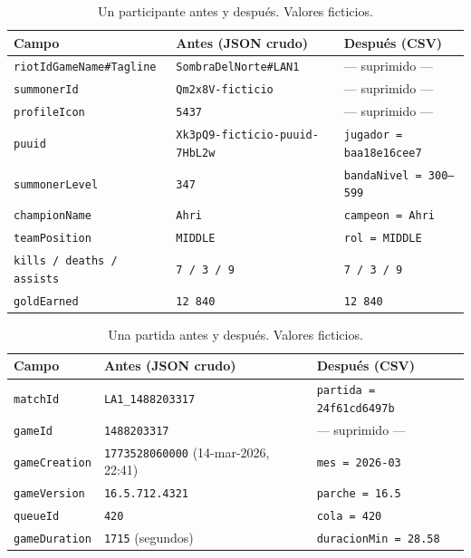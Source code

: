\documentclass[11pt,letterpaper]{article}
\begin{document}
\begin{table}[H]\centering\small
\caption{Un participante antes y después. Valores ficticios.}
\begin{tabular}{p{4.2cm}p{5.6cm}p{5cm}}
\toprule
Campo & Antes (JSON crudo) & Después (CSV) \\
\midrule
\texttt{riotIdGameName\#Tagline} & \texttt{SombraDelNorte\#LAN1} & \textcolor{suave}{— suprimido —} \\
\texttt{summonerId} & \texttt{Qm2x8V-ficticio} & \textcolor{suave}{— suprimido —} \\
\texttt{profileIcon} & \texttt{5437} & \textcolor{suave}{— suprimido —} \\
\texttt{puuid} & \texttt{Xk3pQ9-ficticio-puuid-7HbL2w} & \texttt{jugador = baa18e16cee7} \\
\texttt{summonerLevel} & \texttt{347} & \texttt{bandaNivel = 300–599} \\
\texttt{championName} & \texttt{Ahri} & \texttt{campeon = Ahri} \\
\texttt{teamPosition} & \texttt{MIDDLE} & \texttt{rol = MIDDLE} \\
\texttt{kills / deaths / assists} & \texttt{7 / 3 / 9} & \texttt{7 / 3 / 9} \\
\texttt{goldEarned} & \texttt{12\,840} & \texttt{12\,840} \\
\bottomrule
\end{tabular}
\end{table}

\begin{table}[H]\centering\small
\caption{Una partida antes y después. Valores ficticios.}
\begin{tabular}{p{4.2cm}p{5.6cm}p{5cm}}
\toprule
Campo & Antes (JSON crudo) & Después (CSV) \\
\midrule
\texttt{matchId} & \texttt{LA1\_1488203317} & \texttt{partida = 24f61cd6497b} \\
\texttt{gameId} & \texttt{1488203317} & \textcolor{suave}{— suprimido —} \\
\texttt{gameCreation} & \texttt{1773528060000} (14-mar-2026, 22:41) & \texttt{mes = 2026-03} \\
\texttt{gameVersion} & \texttt{16.5.712.4321} & \texttt{parche = 16.5} \\
\texttt{queueId} & \texttt{420} & \texttt{cola = 420} \\
\texttt{gameDuration} & \texttt{1715} (segundos) & \texttt{duracionMin = 28.58} \\
\bottomrule
\end{tabular}
\end{table}
\end{document}
